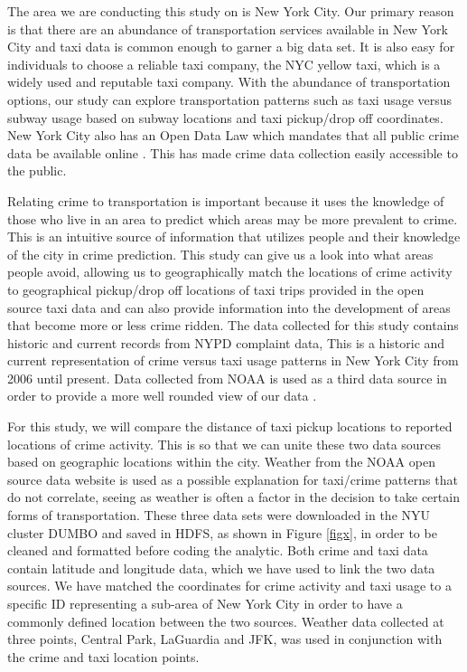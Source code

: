 \documentclass{sigkddExp}
\begin{document}
The area we are conducting this study on is New York City. Our primary reason is that there are an abundance of transportation services available in New York City and taxi data is common enough to garner a big data set. It is also easy for individuals to choose a reliable taxi company, the NYC yellow taxi, which is a widely used and reputable taxi company. With the abundance of transportation options, our study can explore transportation patterns such as taxi usage versus subway usage based on subway locations and taxi pickup/drop off coordinates. New York City also has an Open Data Law which mandates that all public crime data be available online \cite{OpenDat}. This has made crime data collection easily accessible to the public.

Relating crime to transportation is important because it uses the knowledge of those who live in an area to predict which areas may be more prevalent to crime. This is an intuitive source of information that utilizes people and their knowledge of the city in crime prediction. This study can give us a look into what areas people avoid, allowing us to geographically match the locations of crime activity to geographical pickup/drop off locations of taxi trips provided in the open source taxi data \cite{Taxi} and can also provide information into the development of areas that become more or less crime ridden. The data collected for this study contains historic \cite{NYPDHis} and current \cite{NYPDCur} records from NYPD complaint data, This is a historic and current representation of crime versus taxi usage patterns in New York City from 2006 until present. Data collected from NOAA \cite{NOAA} is used as a third data source in order to provide a more well rounded view of our data . 

For this study, we will compare the distance of taxi pickup locations to reported locations of crime activity. This is so that we can unite these two data sources based on geographic locations within the city. Weather from the NOAA open source data website is used as a possible explanation for taxi/crime patterns that do not correlate, seeing as weather is often a factor in the decision to take certain forms of transportation. These three data sets were downloaded in the NYU cluster DUMBO and saved in HDFS, as shown in Figure \ref{figx}, in order to be cleaned and formatted before coding the analytic. Both crime and taxi data contain latitude and longitude data, which we have used to link the two data sources. We have matched the coordinates for crime activity and taxi usage to a specific ID representing a sub-area of New York City in order to have a commonly defined location between the two sources. Weather data collected at three points, Central Park, LaGuardia and JFK, was used in conjunction with the crime and taxi location points. 
\end{document}

